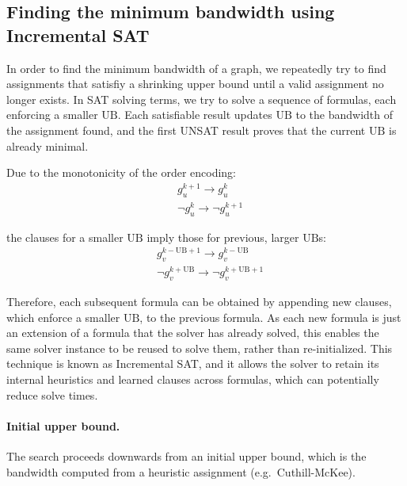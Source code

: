 \documentclass[a4paper,fleqn]{cas-sc}
\begin{document}
    \subsection{Finding the minimum bandwidth using Incremental SAT}
        In order to find the minimum bandwidth of a graph, we repeatedly try to find assignments that satisfiy a shrinking upper bound until a valid assignment no longer exists. In SAT solving terms, we try to solve a sequence of formulas, each enforcing a smaller $\text{UB}$. Each satisfiable result updates $\text{UB}$ to the bandwidth of the assignment found, and the first UNSAT result proves that the current $\text{UB}$ is already minimal.

        \vspace{1em}

        \noindent Due to the monotonicity of the order encoding:
        \begin{align}
            &g_u^{k+1} \rightarrow g_u^k \\
            &\neg g_u^k \rightarrow \neg g_u^{k+1}
        \end{align}
        
        \noindent the clauses for a smaller $\text{UB}$ imply those for previous, larger $\text{UB}$s:
        \begin{align}
            &g_v^{k-\text{UB}+1} \rightarrow g_v^{k-\text{UB}} \\
            &\neg g_v^{k+\text{UB}} \rightarrow \neg g_v^{k+\text{UB}+1}
        \end{align}
        
        Therefore, each subsequent formula can be obtained by appending new clauses, which enforce a smaller $\text{UB}$, to the previous formula. As each new formula is just an extension of a formula that the solver has already solved, this enables the same solver instance to be reused to solve them, rather than re-initialized. This technique is known as Incremental SAT, and it allows the solver to retain its internal heuristics and learned clauses across formulas, which can potentially reduce solve times.

        \paragraph{\textbf{Initial upper bound.}}
            The search proceeds downwards from an initial upper bound, which is the bandwidth computed from a heuristic assignment (e.g.\ Cuthill-McKee).
\end{document}
